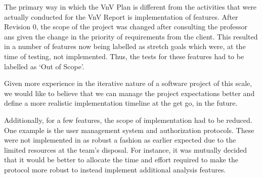 \documentclass[12pt, titlepage]{article}
\begin{document}
\begin{enumerate}
  The primary way in which the VnV Plan is different from the activities that were actually conducted for 
  the VnV Report is implementation of features. After Revision 0, the scope of the project was changed after consulting the professor 
  ans given the change in the priority of requirements from the client. This resulted in a number of features now being labelled as 
  stretch goals which were, at the time of testing, not implemented. Thus, the tests for these features had to be labelled as `Out of Scope'.

  Given more experience in the iterative nature of a software project of this scale, we would like to believe that we can manage the project 
  expectations better and define a more realistic implementation timeline at the get go, in the future.

  Additionally, for a few features, the scope of implementation had to be reduced. One example is the user management system and authorization 
  protocols. These were not implemented in as robust a fashion as earlier expected due to the limited resources at the team's disposal. For instance, it was
  mutually decided that it would be better to allocate the time and effort required to make the protocol more robust to instead implement additional
  analysis features.
\end{enumerate}
\end{document}
